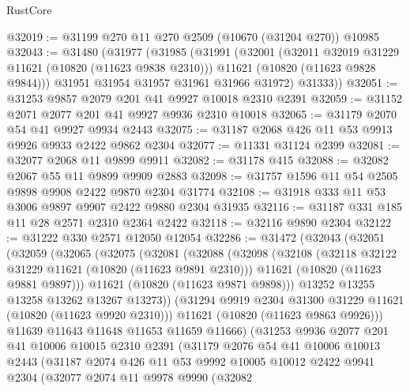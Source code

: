 \begin{lexlean}{RustCore}
\begin{coremodule}
@32019 := @31199 @270 @11 @270 @2509 (@10670 (@31204 @270)) @10985
@32043 := @31480
    (@31977
      (@31985
        (@31991
          (@32001
            (@32011 @32019 @31229 @11621 (@10820 (@11623 @9838 @2310)))
            @11621
            (@10820 (@11623 @9828 @9844)))
          @31951
          @31954
          @31957
          @31961
          @31966
          @31972)
        @31333))
@32051 := @31253 @9857 @2079 @201 @41 @9927 @10018 @2310 @2391
@32059 := @31152 @2071 @2077 @201 @41 @9927 @9936 @2310 @10018
@32065 := @31179 @2070 @54 @41 @9927 @9934 @2443
@32075 := @31187 @2068 @426 @11 @53 @9913 @9926 @9933 @2422 @9862 @2304
@32077 := @11331 @31124 @2399
@32081 := @32077 @2068 @11 @9899 @9911
@32082 := @31178 @415
@32088 := @32082 @2067 @55 @11 @9899 @9909 @2883
@32098 := @31757 @1596 @11 @54 @2505 @9898 @9908 @2422 @9870 @2304 @31774
@32108 := @31918 @333 @11 @53 @3006 @9897 @9907 @2422 @9880 @2304 @31935
@32116 := @31187 @331 @185 @11 @28 @2571 @2310 @2364 @2422
@32118 := @32116 @9890 @2304
@32122 := @31222 @330 @2571 @12050 @12054
@32286 := @31472
    (@32043
      (@32051
        (@32059
          (@32065
            (@32075
              (@32081
                (@32088
                  (@32098
                    (@32108
                      (@32118 @32122 @31229 @11621 (@10820 (@11623 @9891 @2310)))
                      @11621
                      (@10820 (@11623 @9881 @9897)))
                    @11621
                    (@10820 (@11623 @9871 @9898)))
                  @13252
                  @13255
                  @13258
                  @13262
                  @13267
                  @13273))
              (@31294 @9919 @2304 @31300 @31229 @11621 (@10820 (@11623 @9920 @2310)))
              @11621
              (@10820 (@11623 @9863 @9926)))
            @11639
            @11643
            @11648
            @11653
            @11659
            @11666)
          (@31253
            @9936
            @2077
            @201
            @41
            @10006
            @10015
            @2310
            @2391
            (@31179
              @2076
              @54
              @41
              @10006
              @10013
              @2443
              (@31187
                @2074
                @426
                @11
                @53
                @9992
                @10005
                @10012
                @2422
                @9941
                @2304
                (@32077
                  @2074
                  @11
                  @9978
                  @9990
                  (@32082

\end{coremodule}
\end{lexlean}
